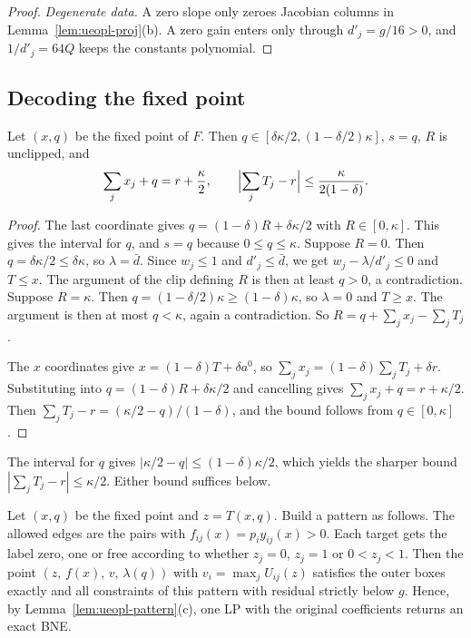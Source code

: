 \begin{proof}
\emph{Degenerate data.} A zero slope only zeroes Jacobian columns in Lemma~\ref{lem:ueopl-proj}(b). A
zero gain enters only through $d'_j=g/16>0$, and $1/d'_j=64Q$ keeps the constants polynomial.
\end{proof}

\subsection{Decoding the fixed point}

\begin{lemma}\label{lem:ueopl-budget}
Let $(x,q)$ be the fixed point of $F$. Then $q\in[\delta\kappa/2,(1-\delta/2)\kappa]$, $s=q$, $R$ is
unclipped, and
\[
  \sum_jx_j+q=r+\frac\kappa2,\qquad \Bigl|\sum_jT_j-r\Bigr|\le\frac\kappa{2(1-\delta)}.
\]
\end{lemma}

\begin{proof}
The last coordinate gives $q=(1-\delta)R+\delta\kappa/2$ with $R\in[0,\kappa]$. This gives the
interval for $q$, and $s=q$ because $0\le q\le\kappa$. Suppose $R=0$. Then $q=\delta\kappa/2\le\delta\kappa$,
so $\lambda=\bar d$. Since $w_j\le1$ and $d'_j\le\bar d$, we get $w_j-\lambda/d'_j\le0$ and $T\le x$. The
argument of the clip defining $R$ is then at least $q>0$, a contradiction. Suppose $R=\kappa$. Then
$q=(1-\delta/2)\kappa\ge(1-\delta)\kappa$, so $\lambda=0$ and $T\ge x$. The argument is then at most
$q<\kappa$, again a contradiction. So $R=q+\sum_jx_j-\sum_jT_j$.

The $x$ coordinates give $x=(1-\delta)T+\delta a^0$, so $\sum_jx_j=(1-\delta)\sum_jT_j+\delta r$.
Substituting into $q=(1-\delta)R+\delta\kappa/2$ and cancelling gives $\sum_jx_j+q=r+\kappa/2$. Then
$\sum_jT_j-r=(\kappa/2-q)/(1-\delta)$, and the bound follows from $q\in[0,\kappa]$.
\end{proof}

The interval for $q$ gives $|\kappa/2-q|\le(1-\delta)\kappa/2$, which yields the sharper bound
$|\sum_jT_j-r|\le\kappa/2$. Either bound suffices below.

\begin{lemma}[Decoding]\label{lem:ueopl-decoding}
\statusrefereed
Let $(x,q)$ be the fixed point and $z=T(x,q)$. Build a pattern as follows. The allowed edges are the
pairs with $f_{ij}(x)=p_iy_{ij}(x)>0$. Each target gets the label zero, one or free according to
whether $z_j=0$, $z_j=1$ or $0<z_j<1$. Then the point $(z,\,f(x),\,v,\,\lambda(q))$ with
$v_i=\max_jU_{ij}(z)$ satisfies the outer boxes exactly and all constraints of this pattern with
residual strictly below $g$. Hence, by Lemma~\ref{lem:ueopl-pattern}(c), one LP with the original
coefficients returns an exact BNE.
\end{lemma}

